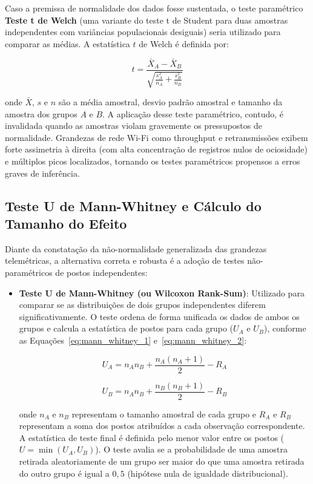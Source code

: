 Caso a premissa de normalidade dos dados fosse sustentada, o teste paramétrico \textbf{Teste t de Welch} (uma variante do teste t de Student para duas amostras independentes com variâncias populacionais desiguais) seria utilizado para comparar as médias. A estatística $t$ de Welch é definida por:

\begin{equation}
\label{eq:welch_formula}
t = \frac{\bar{X}_A - \bar{X}_B}{\sqrt{\frac{s_A^2}{n_A} + \frac{s_B^2}{n_B}}}
\end{equation}

onde $\bar{X}$, $s$ e $n$ são a média amostral, desvio padrão amostral e tamanho da amostra dos grupos $A$ e $B$. A aplicação desse teste paramétrico, contudo, é invalidada quando as amostras violam gravemente os pressupostos de normalidade. Grandezas de rede Wi-Fi como throughput e retransmissões exibem forte assimetria à direita (com alta concentração de registros nulos de ociosidade) e múltiplos picos localizados, tornando os testes paramétricos propensos a erros graves de inferência.

\subsection{Teste U de Mann-Whitney e Cálculo do Tamanho do Efeito}
\label{subsec:metodologia_mann_whitney_teoria}

Diante da constatação da não-normalidade generalizada das grandezas telemétricas, a alternativa correta e robusta é a adoção de testes não-paramétricos de postos independentes:

\begin{itemize}
    \item \textbf{Teste U de Mann-Whitney (ou Wilcoxon Rank-Sum)}: Utilizado para comparar se as distribuições de dois grupos independentes diferem significativamente. O teste ordena de forma unificada os dados de ambos os grupos e calcula a estatística de postos para cada grupo ($U_A$ e $U_B$), conforme as Equações~\ref{eq:mann_whitney_1} e~\ref{eq:mann_whitney_2}:
    
    \begin{equation}
    \label{eq:mann_whitney_1}
    U_A = n_A n_B + \frac{n_A(n_A + 1)}{2} - R_A
    \end{equation}
    
    \begin{equation}
    \label{eq:mann_whitney_2}
    U_B = n_A n_B + \frac{n_B(n_B + 1)}{2} - R_B
    \end{equation}
    
    onde $n_A$ e $n_B$ representam o tamanho amostral de cada grupo e $R_A$ e $R_B$ representam a soma dos postos atribuídos a cada observação correspondente. A estatística de teste final é definida pelo menor valor entre os postos ($U = \min(U_A, U_B)$). O teste avalia se a probabilidade de uma amostra retirada aleatoriamente de um grupo ser maior do que uma amostra retirada do outro grupo é igual a $0,5$ (hipótese nula de igualdade distribucional).
\end{itemize}

